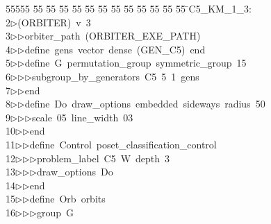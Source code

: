 %
%
\begin{tabbing}
55555 \= 55 \= 55 \= 55 \= 55 \= 55 \= 55 \= 55 \= 55 \= 55 \= 55 \= 55 \= 55 \= \>C5\_KM\_1\_3:\\[0pt]
2\>$\triangleright$\>(ORBITER)\ v\ 3\ \\[0pt]
3\>$\triangleright$\>$\triangleright$\>orbiter\_path\ (ORBITER\_EXE\_PATH)\ \\[0pt]
4\>$\triangleright$\>$\triangleright$\>define\ gens\ vector\ dense\ (GEN\_C5)\ end\ \\[0pt]
5\>$\triangleright$\>$\triangleright$\>define\ G\ permutation\_group\ symmetric\_group\ 15\ \\[0pt]
6\>$\triangleright$\>$\triangleright$\>$\triangleright$\>subgroup\_by\_generators\ C5\ 5\ 1\ gens\ \\[0pt]
7\>$\triangleright$\>$\triangleright$\>end\ \\[0pt]
8\>$\triangleright$\>$\triangleright$\>define\ Do\ draw\_options\ embedded\ sideways\ radius\ 50\ \\[0pt]
9\>$\triangleright$\>$\triangleright$\>$\triangleright$\>scale\ 05\ line\_width\ 03\ \\[0pt]
10\>$\triangleright$\>$\triangleright$\>end\ \\[0pt]
11\>$\triangleright$\>$\triangleright$\>define\ Control\ poset\_classification\_control\ \\[0pt]
12\>$\triangleright$\>$\triangleright$\>$\triangleright$\>problem\_label\ C5\ W\ depth\ 3\ \\[0pt]
13\>$\triangleright$\>$\triangleright$\>$\triangleright$\>draw\_options\ Do\ \\[0pt]
14\>$\triangleright$\>$\triangleright$\>end\ \\[0pt]
15\>$\triangleright$\>$\triangleright$\>define\ Orb\ orbits\ \\[0pt]
16\>$\triangleright$\>$\triangleright$\>$\triangleright$\>group\ G\ \\[0pt]

\end{tabbing}
